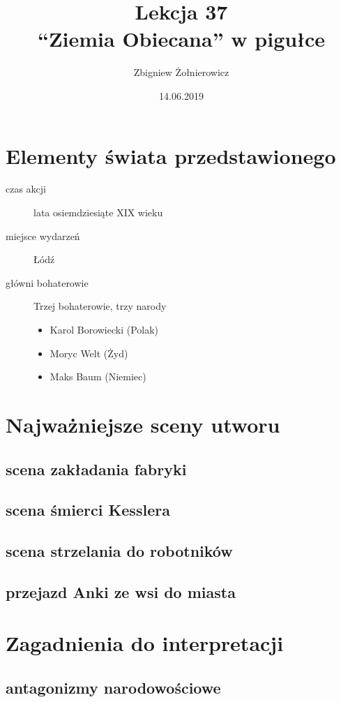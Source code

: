 \documentclass[a4paper]{article}
\begin{document}
\title{
        {\huge Lekcja 37} \\
        {\large ``Ziemia Obiecana'' w pigułce}
}
\author{Zbigniew Żołnierowicz}
\date{14.06.2019}
\maketitle
\section{Elementy świata przedstawionego}
\begin{description}
    \item[czas akcji] lata osiemdziesiąte XIX wieku
    \item[miejsce wydarzeń] Łódź
    \item[główni bohaterowie] Trzej bohaterowie, trzy narody
    \begin{itemize}
        \item Karol Borowiecki (Polak)
        \item Moryc Welt (Żyd)
        \item Maks Baum (Niemiec)
    \end{itemize}
\end{description}
\section{Najważniejsze sceny utworu}
\subsection{scena zakładania fabryki}
\subsection{scena śmierci Kesslera}
\subsection{scena strzelania do robotników}
\subsection{przejazd Anki ze wsi do miasta}
\section{Zagadnienia do interpretacji}
\subsection{antagonizmy narodowościowe}
\end{document}
